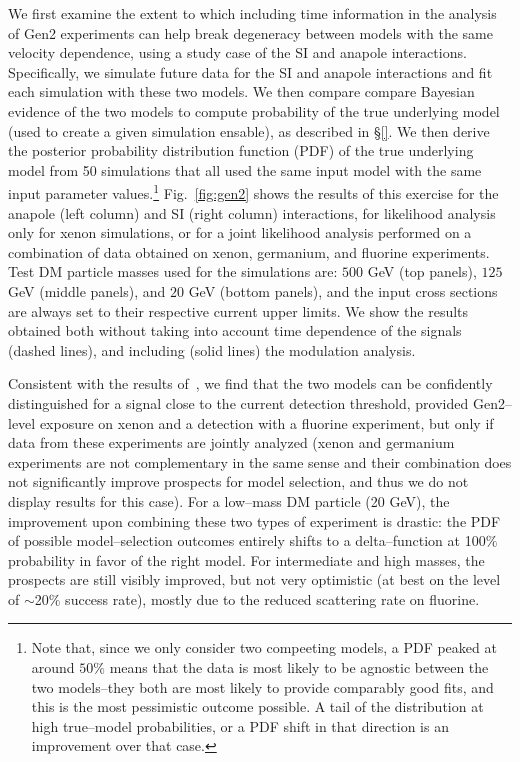 \documentclass[11pt]{article}
\newcommand{\Fig}[1]{Fig.~\ref{#1}} \newcommand{\Figs}[2]{Figs.~\ref{#1} and \ref{#2}}
\begin{document}
We first examine the extent to which including time information in the analysis of Gen2 experiments can help break degeneracy between models with the same velocity dependence, using a study case of the SI and anapole interactions. Specifically, we simulate future data for the SI and anapole interactions and fit each simulation with these two models. We then compare compare Bayesian evidence of the two models to compute probability of the true underlying model (used to create a given simulation ensable), as described in \S\ref{}. We then derive the posterior probability distribution function (PDF) of the true underlying model from 50 simulations that all used the same input model with the same input parameter values.\footnote{Note that, since we only consider two compeeting models, a PDF peaked at around $50\%$ means that the data is most likely to be agnostic between the two models--they both are most likely to provide comparably good fits, and this is the most pessimistic outcome possible. A tail of the distribution at high true--model probabilities, or a PDF shift in that direction is an improvement over that case.} \Fig{fig:gen2} shows the results of this exercise for the anapole (left column) and SI (right column) interactions, for likelihood analysis only for xenon simulations, or for a joint likelihood analysis performed on a combination of data obtained on xenon, germanium, and fluorine experiments. Test DM particle masses used for the simulations are: $500$ GeV (top panels), $125$ GeV (middle panels), and $20$ GeV (bottom panels), and the input cross sections are always set to their respective current upper limits. We show the results obtained both without taking into account time dependence of the signals (dashed lines), and including (solid lines) the modulation analysis. 

Consistent with the results of~\cite{Gluscevic:2015sqa}, we find that the two models can be confidently distinguished for a signal close to the current detection threshold, provided Gen2--level exposure on xenon and a detection with a fluorine experiment, but only if data from these experiments are jointly analyzed (xenon and germanium experiments are not complementary in the same sense and their combination does not significantly improve prospects for model selection, and thus we do not display results for this case). For a low--mass DM particle (20 GeV), the improvement upon combining these two types of experiment is drastic: the PDF of possible model--selection outcomes entirely shifts to a delta--function at 100$\%$ probability in favor of the right model. For intermediate and high masses, the prospects are still visibly improved, but not very optimistic (at best on the level of $\sim$20$\%$ success rate), mostly due to the reduced scattering rate on fluorine.  
\end{document}
